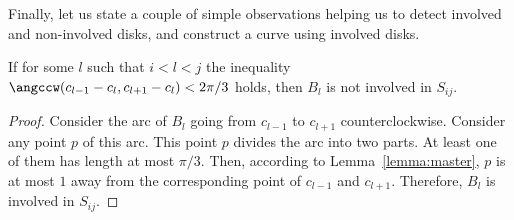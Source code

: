 \begin{enumerate}[label={\bf Case \arabic*: }, wide, labelwidth=!, labelindent=0pt]





Finally, let us state a couple of simple observations helping us to detect involved and non-involved disks, and construct a curve using involved disks.

\begin{observation}
If for some $l$ such that $i < l < j$ the inequality $\angccw(c_{l-1} - c_l, c_{l+1} - c_l) < 2\pi/3$ holds, then $B_l$ is not involved in $S_{ij}$.
\end{observation}

\begin{proof}
Consider the arc of $B_l$ going from $c_{l-1}$ to $c_{l+1}$ counterclockwise. Consider any point $p$ of this arc. This point $p$ divides the arc into two parts. At least one of them has length at most $\pi/3$. Then, according to Lemma~\ref{lemma:master}, $p$ is at most $1$ away from the corresponding point of $c_{l-1}$ and $c_{l+1}$. Therefore, $B_l$ is involved in $S_{ij}$.
\end{proof}


\end{enumerate}
